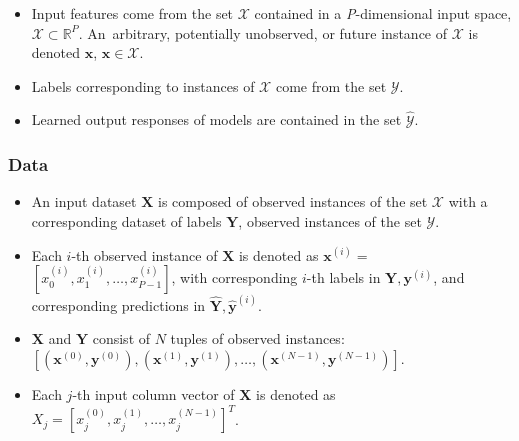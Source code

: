\documentclass[information,article,accept,moreauthors,pdftex]{Definitions/mdpi}
\begin{document}
\begin{itemize}[leftmargin=*,labelsep=5.8mm]
	\item Input features come from the set $\mathcal{X}$ contained in a \textit{P}-dimensional input space, $\mathcal{X} \subset \mathbb{R}^P$.  An~arbitrary, potentially unobserved, or future instance of $\mathcal{X}$ is denoted $\mathbf{x}$, $\mathbf{x} \in \mathcal{X}$.
	\item Labels corresponding to instances of $\mathcal{X}$ come from the set $\mathcal{Y}$.
	\item Learned output responses of models are contained in the set $\mathcal{\hat{Y}}$. %
\end{itemize}	

\subsubsection{Data} 

\begin{itemize}[leftmargin=*,labelsep=5.8mm]
	\item An input dataset $\mathbf{X}$ is composed of observed instances of the set $\mathcal{X}$ with a corresponding dataset of labels $\mathbf{Y}$, observed instances of the set $\mathcal{Y}$. 
	\item Each $i$-th observed instance of $\mathbf{X}$ is denoted as $\mathbf{x}^{(i)} = $  
	$[x_0^{(i)}, x_1^{(i)}, \dots, x_{\textit{P}-1}^{(i)}]$, with corresponding $i$-th labels in $\mathbf{Y}, \mathbf{y}^{(i)}$, and corresponding predictions in $\mathbf{\hat{Y}}, \mathbf{\hat{y}}^{(i)}$. %
	\item $\mathbf{X}$ and $\mathbf{Y}$ consist of $N$ tuples of observed instances: $[(\mathbf{x}^{(0)},\mathbf{y}^{(0)}), (\mathbf{x}^{(1)},\mathbf{y}^{(1)}), \dots,(\mathbf{x}^{(N-1)},\mathbf{y}^{(N-1)})]$. %
	\item Each $j$-th input column vector of $\mathbf{X}$ is denoted as $X_j = [x_{j}^{(0)}, x_{j}^{(1)}, \dots, x_{j}^{(N-1)}]^T$.
\end{itemize}	 
\end{document}
